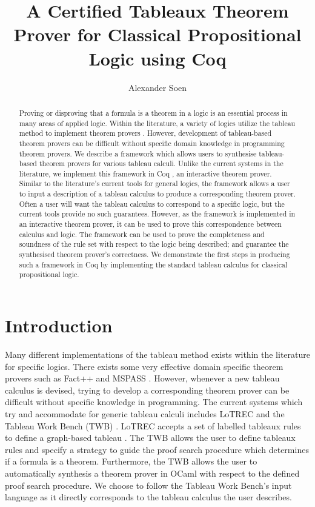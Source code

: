 \documentclass{llncs}
\begin{document}
\title{A Certified Tableaux Theorem Prover for Classical Propositional Logic
using Coq}

\author{Alexander Soen}

\maketitle
%
\begin{abstract}
Proving or disproving that a formula is a theorem in a logic is an essential
process in many areas of applied logic. Within the literature, a variety of
logics utilize the tableau method to implement theorem provers
\cite{d2013handbook}. However, development of tableau-based theorem provers can
be difficult without specific domain knowledge in programming theorem provers.
We describe a framework which allows users to synthesise tableau-based theorem
provers for various tableau calculi. Unlike the current systems in the
literature, we implement this framework in Coq \cite{barras1997coq}, an
interactive theorem prover. Similar to the literature's current tools for
general logics, the framework allows a user to input a description of a
tableau calculus to produce a corresponding theorem prover. Often a user will
want the tableau calculus to correspond to a specific logic, but the current
tools provide no such guarantees. However, as the framework is implemented in
an interactive theorem prover, it can be used to prove this correspondence
between calculus and logic. The framework can be used to prove the completeness
and soundness of the rule set with respect to the logic being described; and
guarantee the synthesised theorem prover's correctness. We demonstrate the
first steps in producing such a framework in Coq by implementing the
standard tableau calculus for classical propositional logic.
\end{abstract}
%
\section{Introduction}
%
Many different implementations of the tableau method exists within the
literature for specific logics. There exists some very effective domain
specific theorem provers such as Fact++ \cite{tsarkov2006fact++} and MSPASS
\cite{hustadt2000mspass}. However, whenever a new tableau calculus is devised,
trying to develop a corresponding theorem prover can be difficult without
specific knowledge in programming. The current systems which try and
accommodate for generic tableau calculi includes LoTREC \cite{del2001lotrec}
and the Tableau Work Bench (TWB) \cite{abate2007tableau}. LoTREC accepts a set of
labelled tableaux rules to define a graph-based tableau
\cite{castilho1997modal}. The TWB allows the user to define
tableaux rules and specify a strategy to guide the proof search procedure which
determines if a formula is a theorem. Furthermore, the TWB allows the user to
automatically synthesis a theorem prover in OCaml with respect to the defined
proof search procedure. We choose to follow the Tableau Work Bench's input
language as it directly corresponds to the tableau calculus the user describes.
\end{document}
